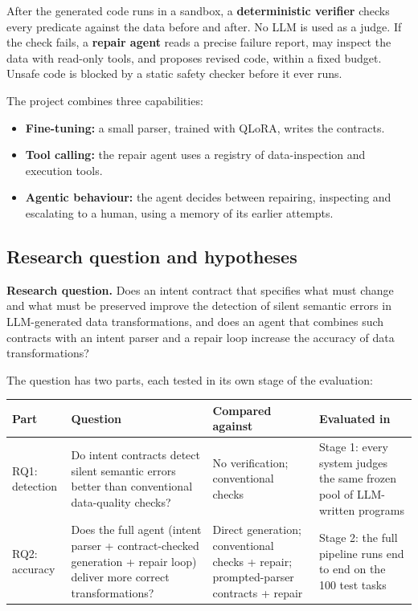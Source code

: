 \documentclass[11pt]{article}
\providecommand{\tightlist}{\setlength{\itemsep}{0pt}\setlength{\parskip}{0pt}}
\begin{document}
After the generated code runs in a sandbox, a \textbf{deterministic
verifier} checks every predicate against the data before and after. No
LLM is used as a judge. If the check fails, a \textbf{repair agent}
reads a precise failure report, may inspect the data with read-only
tools, and proposes revised code, within a fixed budget. Unsafe code is
blocked by a static safety checker before it ever runs.

The project combines three capabilities:

\begin{itemize}
\tightlist
\item
  \textbf{Fine-tuning:} a small parser, trained with QLoRA, writes the
  contracts.
\item
  \textbf{Tool calling:} the repair agent uses a registry of
  data-inspection and execution tools.
\item
  \textbf{Agentic behaviour:} the agent decides between repairing,
  inspecting and escalating to a human, using a memory of its earlier
  attempts.
\end{itemize}

\subsection{Research question and hypotheses}

\textbf{Research question.} Does an intent contract that specifies what
must change and what must be preserved improve the detection of silent
semantic errors in LLM-generated data transformations, and does an agent
that combines such contracts with an intent parser and a repair loop
increase the accuracy of data transformations?

The question has two parts, each tested in its own stage of the
evaluation:

\begin{table}[!tp]
\centering\footnotesize\setlength{\tabcolsep}{3pt}\renewcommand{\arraystretch}{1.1}
\begin{tabularx}{\textwidth}{l>{\raggedright\arraybackslash}X>{\raggedright\arraybackslash}X>{\raggedright\arraybackslash}X}
\toprule
\textbf{Part} & \textbf{Question} & \textbf{Compared against} & \textbf{Evaluated in} \\
\midrule
RQ1: detection & Do intent contracts detect silent semantic errors better than conventional data-quality checks? & No verification; conventional checks & Stage 1: every system judges the same frozen pool of LLM-written programs \\
RQ2: accuracy & Does the full agent (intent parser + contract-checked generation + repair loop) deliver more correct transformations? & Direct generation; conventional checks + repair; prompted-parser contracts + repair & Stage 2: the full pipeline runs end to end on the 100 test tasks \\
\bottomrule
\end{tabularx}
\end{table}
\end{document}
